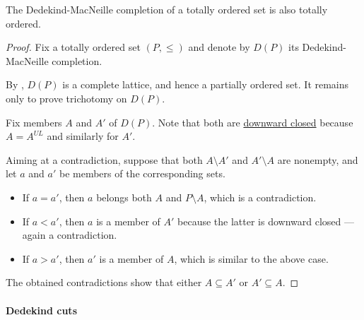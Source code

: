 \begin{proposition}\label{thm:dedekind_macnielle_closure_is_totally_ordered}
  The Dedekind-MacNeille completion of a totally ordered set is also totally ordered.
\end{proposition}
\begin{proof}
  Fix a totally ordered set \( (P, \leq) \) and denote by \( D(P) \) its Dedekind-MacNeille completion.

  By , \( D(P) \) is a complete lattice, and hence a partially ordered set. It remains only to prove trichotomy on \( D(P) \).

  Fix members \( A \) and \( A' \) of \( D(P) \). Note that both are \hyperref[def:closed_ordered_subset]{downward closed} because \( A = A^{UL} \) and similarly for \( A' \).

  Aiming at a contradiction, suppose that both \( A \setminus A' \) and \( A' \setminus A \) are nonempty, and let \( a \) and \( a' \) be members of the corresponding sets.

  \begin{itemize}
    \item If \( a = a' \), then \( a \) belongs both \( A \) and \( P \setminus A \), which is a contradiction.
    \item If \( a < a' \), then \( a \) is a member of \( A' \) because the latter is downward closed --- again a contradiction.
    \item If \( a > a' \), then \( a' \) is a member of \( A \), which is similar to the above case.
  \end{itemize}

  The obtained contradictions show that either \( A \subseteq A' \) or \( A' \subseteq A \).
\end{proof}

\paragraph{Dedekind cuts}

